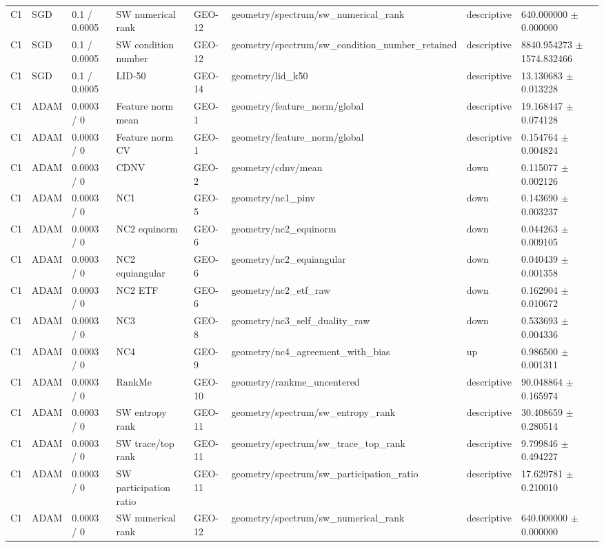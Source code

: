 \begin{longtable}{llllllll}
C1 & SGD & 0.1 / 0.0005 & SW numerical rank & GEO-12 & geometry/spectrum/sw\_numerical\_rank & descriptive & 640.000000 $\pm$ 0.000000 \\
C1 & SGD & 0.1 / 0.0005 & SW condition number & GEO-12 & geometry/spectrum/sw\_condition\_number\_retained & descriptive & 8840.954273 $\pm$ 1574.832466 \\
C1 & SGD & 0.1 / 0.0005 & LID-50 & GEO-14 & geometry/lid\_k50 & descriptive & 13.130683 $\pm$ 0.013228 \\
C1 & ADAM & 0.0003 / 0 & Feature norm mean & GEO-1 & geometry/feature\_norm/global & descriptive & 19.168447 $\pm$ 0.074128 \\
C1 & ADAM & 0.0003 / 0 & Feature norm CV & GEO-1 & geometry/feature\_norm/global & descriptive & 0.154764 $\pm$ 0.004824 \\
C1 & ADAM & 0.0003 / 0 & CDNV & GEO-2 & geometry/cdnv/mean & down & 0.115077 $\pm$ 0.002126 \\
C1 & ADAM & 0.0003 / 0 & NC1 & GEO-5 & geometry/nc1\_pinv & down & 0.143690 $\pm$ 0.003237 \\
C1 & ADAM & 0.0003 / 0 & NC2 equinorm & GEO-6 & geometry/nc2\_equinorm & down & 0.044263 $\pm$ 0.009105 \\
C1 & ADAM & 0.0003 / 0 & NC2 equiangular & GEO-6 & geometry/nc2\_equiangular & down & 0.040439 $\pm$ 0.001358 \\
C1 & ADAM & 0.0003 / 0 & NC2 ETF & GEO-6 & geometry/nc2\_etf\_raw & down & 0.162904 $\pm$ 0.010672 \\
C1 & ADAM & 0.0003 / 0 & NC3 & GEO-8 & geometry/nc3\_self\_duality\_raw & down & 0.533693 $\pm$ 0.004336 \\
C1 & ADAM & 0.0003 / 0 & NC4 & GEO-9 & geometry/nc4\_agreement\_with\_bias & up & 0.986500 $\pm$ 0.001311 \\
C1 & ADAM & 0.0003 / 0 & RankMe & GEO-10 & geometry/rankme\_uncentered & descriptive & 90.048864 $\pm$ 0.165974 \\
C1 & ADAM & 0.0003 / 0 & SW entropy rank & GEO-11 & geometry/spectrum/sw\_entropy\_rank & descriptive & 30.408659 $\pm$ 0.280514 \\
C1 & ADAM & 0.0003 / 0 & SW trace/top rank & GEO-11 & geometry/spectrum/sw\_trace\_top\_rank & descriptive & 9.799846 $\pm$ 0.494227 \\
C1 & ADAM & 0.0003 / 0 & SW participation ratio & GEO-11 & geometry/spectrum/sw\_participation\_ratio & descriptive & 17.629781 $\pm$ 0.210010 \\
C1 & ADAM & 0.0003 / 0 & SW numerical rank & GEO-12 & geometry/spectrum/sw\_numerical\_rank & descriptive & 640.000000 $\pm$ 0.000000 \\

\end{longtable}
